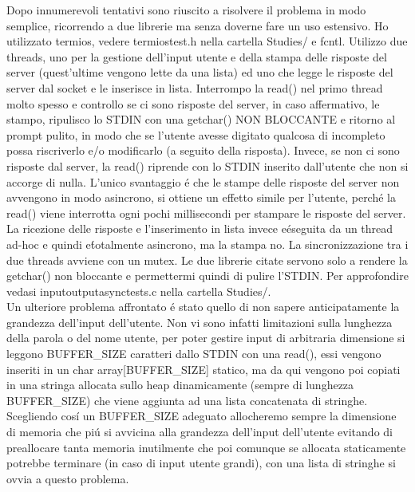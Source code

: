 Dopo innumerevoli tentativi sono riuscito a risolvere il problema in modo semplice, ricorrendo a due librerie ma senza doverne fare un uso estensivo. Ho utilizzato termios, vedere termiostest.h nella cartella Studies/ e fcntl. Utilizzo due threads, uno per la gestione dell'input utente e della stampa delle risposte del server (quest'ultime vengono lette da una lista) ed uno che legge le risposte del server dal socket e le inserisce in lista. Interrompo la read() nel primo thread molto spesso e controllo se ci sono risposte del server, in caso affermativo, le stampo, ripulisco lo STDIN con una getchar() NON BLOCCANTE e ritorno al prompt pulito, in modo che se l'utente avesse digitato qualcosa di incompleto possa riscriverlo e/o modificarlo (a seguito della risposta). Invece, se non ci sono risposte dal server, la read() riprende con lo STDIN inserito dall'utente che non si accorge di nulla. L'unico svantaggio \'e che le stampe delle risposte del server non avvengono in modo asincrono, si ottiene un effetto simile per l'utente, perch\'e la read() viene interrotta ogni pochi millisecondi per stampare le risposte del server. La ricezione delle risposte e l'inserimento in lista invece e\' eseguita da un thread ad-hoc e quindi e\' totalmente asincrono, ma la stampa no. La sincronizzazione tra i due threads avviene con un mutex. Le due librerie citate servono solo a rendere la getchar() non bloccante e permettermi quindi di pulire l'STDIN. Per approfondire vedasi inputoutputasynctests.c nella cartella Studies/.
\\
Un ulteriore problema affrontato \'e stato quello di non sapere anticipatamente la grandezza dell'input dell'utente. Non vi sono infatti limitazioni sulla lunghezza della parola o del nome utente, per poter gestire input di arbitraria dimensione si leggono BUFFER\_SIZE caratteri dallo STDIN con una read(), essi vengono inseriti in un char array[BUFFER\_SIZE] statico, ma da qui vengono poi copiati in una stringa allocata sullo heap dinamicamente (sempre di lunghezza BUFFER\_SIZE) che viene aggiunta ad una lista concatenata di stringhe. Scegliendo cos\'i un BUFFER\_SIZE adeguato allocheremo sempre la dimensione di memoria che pi\'u si avvicina alla grandezza dell'input dell'utente evitando di preallocare tanta memoria inutilmente che poi comunque se allocata staticamente potrebbe terminare (in caso di input utente grandi), con una lista di stringhe si ovvia a questo problema.


